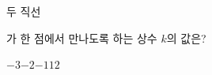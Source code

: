 두 직선 \par\smallskip{}\par\smallskip\noindent 가 한 점에서 만나도록 하는 상수 $k$의 값은?
\begin{choices32}{$-3$}{$-2$}{$-1$}{$1$}{$2$}\end{choices32}
